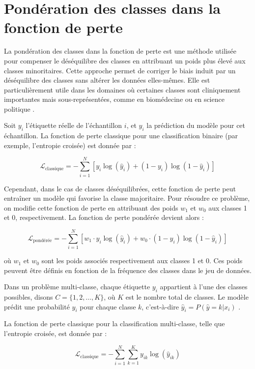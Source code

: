 \documentclass[12pt]{report}
\begin{document}
\section{Pondération des classes dans la fonction de perte}

La pondération des classes dans la fonction de perte est une méthode utilisée pour compenser le déséquilibre des classes en attribuant un poids plus élevé aux classes minoritaires. Cette approche permet de corriger le biais induit par un déséquilibre des classes sans altérer les données elles-mêmes. Elle est particulièrement utile dans les domaines où certaines classes sont cliniquement importantes mais sous-représentées, comme en biomédecine \cite{Chawla2002SMOTE} ou en science politique \cite{King2001Logit}.

Soit $y_i$ l'étiquette réelle de l'échantillon $i$, et $\hat{y}_i$ la prédiction du modèle pour cet échantillon. La fonction de perte classique pour une classification binaire (par exemple, l'entropie croisée) est donnée par :

$$
\mathcal{L}_\text{classique} = - \sum_{i=1}^{N} \left[ y_i \log(\hat{y}_i) + (1 - y_i) \log(1 - \hat{y}_i) \right]
$$

Cependant, dans le cas de classes déséquilibrées, cette fonction de perte peut entraîner un modèle qui favorise la classe majoritaire. Pour résoudre ce problème, on modifie cette fonction de perte en attribuant des poids $w_1$ et $w_0$ aux classes 1 et 0, respectivement. La fonction de perte pondérée devient alors :

$$
\mathcal{L}_\text{pondérée} = - \sum_{i=1}^{N} \left[ w_1 \cdot y_i \log(\hat{y}_i) + w_0 \cdot (1 - y_i) \log(1 - \hat{y}_i) \right]
$$

où $w_1$ et $w_0$ sont les poids associés respectivement aux classes 1 et 0. Ces poids peuvent être définis en fonction de la fréquence des classes dans le jeu de données. 


\vspace{1em}
Dans un problème multi-classe, chaque étiquette $y_i$ appartient à l'une des classes possibles, disons $C = \{1, 2, \dots, K\}$, où $K$ est le nombre total de classes. Le modèle prédit une probabilité $\hat{y}_i$ pour chaque classe $k$, c'est-à-dire $\hat{y}_i = P(\hat{y} = k | x_i)$ \cite{Han2005Borderline}.

La fonction de perte classique pour la classification multi-classe, telle que l'entropie croisée, est donnée par :

$$
\mathcal{L}_\text{classique} = - \sum_{i=1}^{N} \sum_{k=1}^{K} y_{ik} \log(\hat{y}_{ik})
$$
\end{document}

